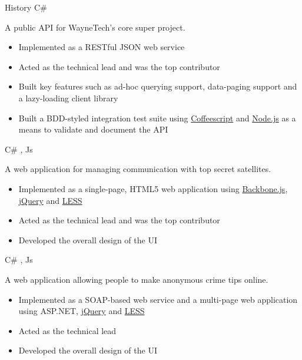 \documentclass{resunate}
\begin{document}
\begin{resume}
\begin{body}
\begin{section}{History}
             {C\#  \wrench}
             {A public API for WayneTech's core super project.
               \begin{itemize}
                 \item Implemented as a RESTful JSON web service
                 \item Acted as the technical lead and was the top contributor
                 \item Built key features such as ad-hoc querying support, data-paging support and a lazy-loading client library
                 \item Built a BDD-styled integration test suite using \href{http://coffeescript.org}{Coffeescript} and \href{http://nodejs.org}{Node.js} as a means to validate and document the API
             \end{itemize}}

             {C\# , Js  \wrench}
             {A web application for managing communication with top secret satellites.
               \begin{itemize}
                 \item Implemented as a single-page, HTML5 web application using \href{http://backbonejs.org/}{Backbone.js}, \href{http://jquery.com/}{jQuery} and \href{http://lesscss.org/}{LESS}
                 \item Acted as the technical lead and was the top contributor
                 \item Developed the overall design of the UI
             \end{itemize}}

             {C\# , Js  \wrench}
             {A web application allowing people to make anonymous crime tips online.
               \begin{itemize}
                 \item Implemented as a SOAP-based web service and a multi-page web application using ASP.NET, \href{http://jquery.com/}{jQuery} and \href{http://lesscss.org/}{LESS}
                 \item Acted as the technical lead
                 \item Developed the overall design of the UI
             \end{itemize}}

    \end{section}


\end{body}
\end{resume}
\end{document}
